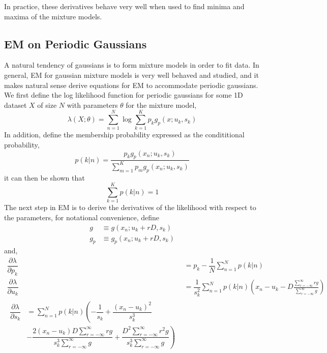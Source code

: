 \documentclass{acm_proc_article-sp}
\begin{document}
In practice, these derivatives behave very well when used to find minima and maxima of the mixture models.

\subsection{EM on Periodic Gaussians}

A natural tendency of gaussians is to form mixture models in order to fit data. In general, EM for gaussian mixture models is very well behaved and studied, and it makes natural sense derive equations for EM to accommodate periodic gaussians. We first define the log likelihood function for periodic gaussians for some 1D dataset \textbf{$X$} of size \textbf{$N$} with parameters \textbf{$\theta$} for the mixture model,
\begin{equation}
\lambda(X; \theta) = \sum_{n=1}^{N} \log \sum_{k=1}^{K} p_k g_p(x;u_k, s_k)
\end{equation}
In addition, define the membership probability expressed as the condititional probability,
\begin{equation}
p(k|n) = \dfrac{p_k g_p(x_n; u_k, s_k)}{\sum\limits^{K}_{m=1} p_m g_p(x_n; u_k, s_k)}
\end{equation}
it can then be shown that
\begin{equation}
\sum_{k=1}^{K} p(k|n) = 1
\end{equation}
The next step in EM is to derive the derivatives of the likelihood with respect to the parameters, for notational convenience, define
\begin{align}
g & \equiv g(x_n; u_k+rD, s_k) \\
g_p & \equiv g_p(x_n; u_k+rD, s_k)
\end{align}
and,
\begin{align}
\dfrac{\partial \lambda}{\partial p_k} & = p_k - \dfrac{1}{N} \sum\limits^{N}_{n=1}p(k|n) \\
\dfrac{\partial \lambda}{\partial u_k} &= \dfrac{1}{s_k^2} \sum_{n=1}^{N}p(k|n) \left(x_n - u_k - D \frac{\sum\limits^{\infty}_{r=-\infty} rg}{\sum\limits^{\infty}_{r=-\infty}g} \right) \\
\begin{split}
\dfrac{\partial \lambda}{\partial s_k} & = \sum\limits^{N}_{n=1}p(k|n) \left(-\dfrac{1}{s_k} + \dfrac{(x_n-u_k)^2}{s_k^3}\right. \\
&\left. -\dfrac{2(x_n-u_k)D\sum\limits^{\infty}_{r=-\infty}rg}{s_k^3 \sum\limits^{\infty}_{r=-\infty}g} + \dfrac{D^2 \sum\limits^{\infty}_{r=-\infty}r^2g}{s_k^3 \sum\limits^{\infty}_{r=-\infty}g} \right)
\end{split}
\end{align}
\end{document}
